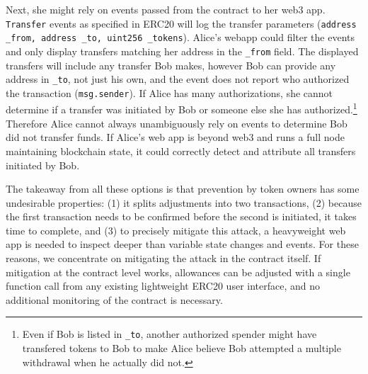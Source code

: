 Next, she might rely on events passed from the contract to her web3 app. \texttt{Transfer} events as specified in ERC20 will log the transfer parameters (\ie  \texttt{address \_from, address \_to, uint256 \_tokens}). Alice's webapp could filter the events and only display transfers matching her address in the \texttt{\_from} field. The displayed transfers will include any transfer Bob makes, however Bob can provide any address in \texttt{\_to}, not just his own, and the event does not report who authorized the transaction (\ie \texttt{msg.sender}). If Alice has many authorizations, she cannot determine if a transfer was initiated by Bob or someone else she has authorized.\footnote{Even if Bob is listed in \texttt{\_to}, another authorized spender might have transfered tokens to Bob to make Alice believe Bob attempted a multiple withdrawal when he actually did not.} Therefore Alice cannot always unambiguously rely on events to determine Bob did not transfer funds. If Alice's web app is beyond web3 and runs a full node maintaining blockchain state, it could correctly detect and attribute all transfers initiated by Bob. 

The takeaway from all these options is that prevention by token owners has some undesirable properties: (1) it splits adjustments into two transactions, (2) because the first transaction needs to be confirmed before the second is initiated, it takes time to complete, and (3) to precisely mitigate this attack, a heavyweight web app is needed to inspect deeper than variable state changes and events. For these reasons, we concentrate on mitigating the attack in the contract itself. If mitigation at the contract level works, allowances can be adjusted with a single function call from any existing lightweight ERC20 user interface, and no additional monitoring of the contract is necessary. 

   
	
